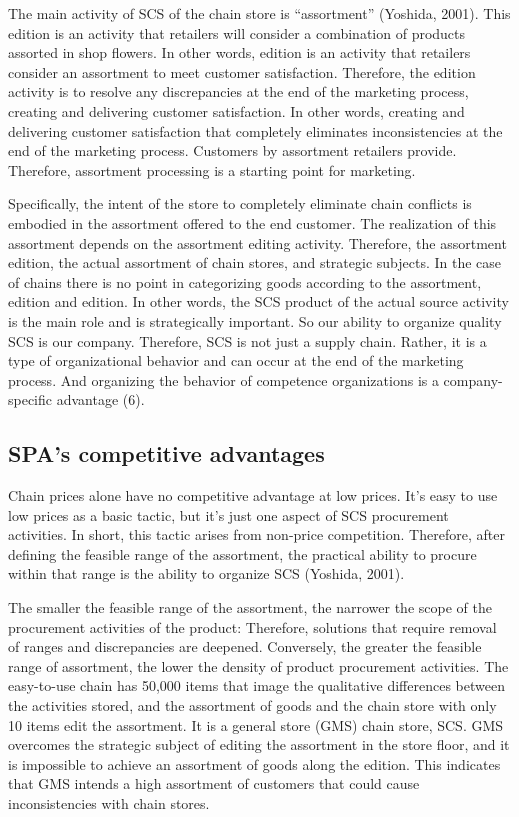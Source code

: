 \documentclass[]{article}
\begin{document}
The main activity of SCS of the chain store is ``assortment'' (Yoshida,
2001). This edition is an activity that retailers will consider a
combination of products assorted in shop flowers. In other words,
edition is an activity that retailers consider an assortment to meet
customer satisfaction. Therefore, the edition activity is to resolve any
discrepancies at the end of the marketing process, creating and
delivering customer satisfaction. In other words, creating and
delivering customer satisfaction that completely eliminates
inconsistencies at the end of the marketing process. Customers by
assortment retailers provide. Therefore, assortment processing is a
starting point for marketing.

Specifically, the intent of the store to completely eliminate chain
conflicts is embodied in the assortment offered to the end customer. The
realization of this assortment depends on the assortment editing
activity. Therefore, the assortment edition, the actual assortment of
chain stores, and strategic subjects. In the case of chains there is no
point in categorizing goods according to the assortment, edition and
edition. In other words, the SCS product of the actual source activity
is the main role and is strategically important. So our ability to
organize quality SCS is our company. Therefore, SCS is not just a supply
chain. Rather, it is a type of organizational behavior and can occur at
the end of the marketing process. And organizing the behavior of
competence organizations is a company-specific advantage (6).

\hypertarget{spas-competitive-advantages}{%
\subsection{SPA's competitive
advantages}\label{spas-competitive-advantages}}

Chain prices alone have no competitive advantage at low prices. It's
easy to use low prices as a basic tactic, but it's just one aspect of
SCS procurement activities. In short, this tactic arises from non-price
competition. Therefore, after defining the feasible range of the
assortment, the practical ability to procure within that range is the
ability to organize SCS (Yoshida, 2001).

The smaller the feasible range of the assortment, the narrower the scope
of the procurement activities of the product: Therefore, solutions that
require removal of ranges and discrepancies are deepened. Conversely,
the greater the feasible range of assortment, the lower the density of
product procurement activities. The easy-to-use chain has 50,000 items
that image the qualitative differences between the activities stored,
and the assortment of goods and the chain store with only 10 items edit
the assortment. It is a general store (GMS) chain store, SCS. GMS
overcomes the strategic subject of editing the assortment in the store
floor, and it is impossible to achieve an assortment of goods along the
edition. This indicates that GMS intends a high assortment of customers
that could cause inconsistencies with chain stores.
\end{document}

